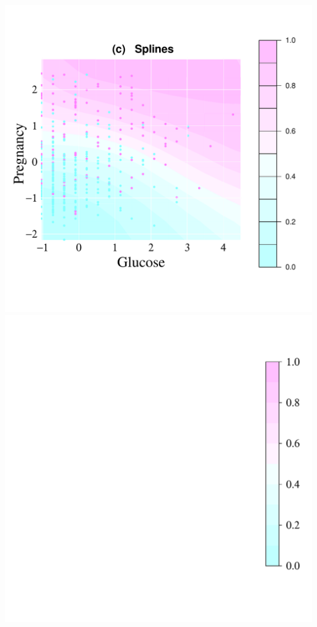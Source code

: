 \documentclass[8pt]{beamer} %
\begin{document}
\begin{frame}[t]
\begin{center}
\includegraphics[scale=0.27, trim = 20mm 23mm 39mm 20mm, clip]{ch5_fig18_spfun_diabetes.pdf}
\includegraphics[scale=0.22, trim = 150mm 4mm 2mm 15mm, clip]{ch5_fig18_legend_diabetes.pdf}
\end{center}
\end{frame}
\end{document}
